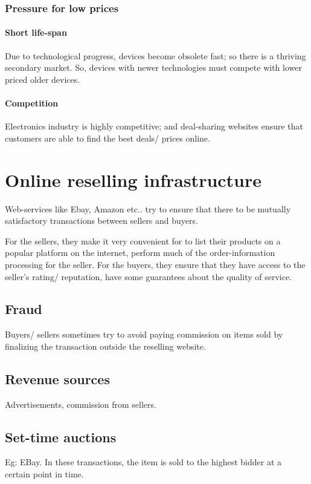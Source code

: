 \documentclass[oneside, article]{memoir}
\begin{document}
\subsection{Pressure for low prices}
\subsubsection{Short life-span}
Due to technological progress, devices become obsolete fast; so there is a thriving secondary market. So, devices with newer technologies must compete with lower priced older devices.

\subsubsection{Competition}
Electronics industry is highly competitive; and deal-sharing websites ensure that customers are able to find the best deals/ prices online.

\chapter{Online reselling infrastructure}
Web-services like Ebay, Amazon etc.. try to ensure that there to be mutually satisfactory transactions between sellers and buyers.

For the sellers, they make it very convenient for to list their products on a popular platform on  the internet, perform much of the order-information processing for the seller. For the buyers, they ensure that they have access to the seller's rating/ reputation, have some guarantees about the quality of service.

\section{Fraud}
Buyers/ sellers sometimes try to avoid paying commission on items sold by finalizing the transaction outside the reselling website.

\section{Revenue sources}
Advertisements, commission from sellers.

\section{Set-time auctions}
Eg: EBay. In these transactions, the item is sold to the highest bidder at a certain point in time.
\end{document}
